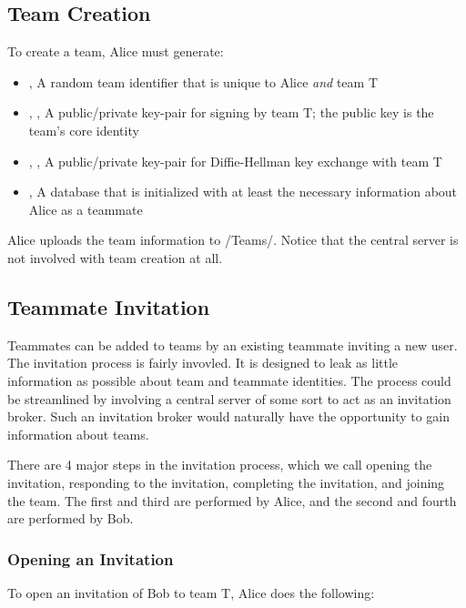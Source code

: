 \documentclass[pldi,10pt,preprint]{sigplanconf-pldi16}
\begin{document}
\subsection{Team Creation}

To create a team, Alice must generate:

\begin{itemize}
\item {}, A random team identifier that is unique to Alice \emph{and} team T
\item {}, , A public/private key-pair for signing by team T; the public key is the team's core identity
\item {}, , A public/private key-pair for Diffie-Hellman key exchange with team T
\item {}, A database that is initialized with at least the necessary information about Alice as a teammate
\end{itemize}

Alice uploads the team information to \slash Teams\slash {}.
Notice that the central server is not involved with team creation at all.

\subsection{Teammate Invitation}

Teammates can be added to teams by an existing teammate inviting a new user.
The invitation process is fairly invovled.
It is designed to leak as little information as possible about team and teammate identities.
The process could be streamlined by involving a central server of some sort to act as an invitation broker.
Such an invitation broker would naturally have the opportunity to gain information about teams.

There are 4 major steps in the invitation process, which we call opening the invitation, responding to the invitation, completing the invitation, and joining the team.
The first and third are performed by Alice, and the second and fourth are performed by Bob.

\subsubsection{Opening an Invitation}

To open an invitation of Bob to team T, Alice does the following:
\end{document}
